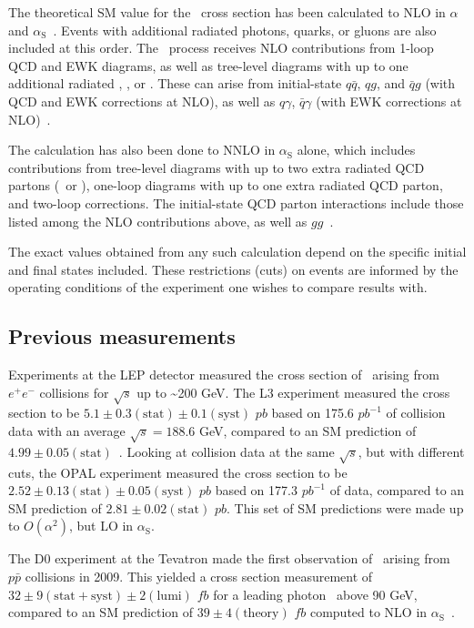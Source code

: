 \documentclass[oneside, letterpaper, 12pt, oldfontcommands]{memoir}
\begin{document}
The theoretical SM value for the \zinvg\ cross section has been calculated to NLO in $\alpha$ and $\alpha_\mathrm{S}$~\cite{ref:JHEP04(2015)018, ref:JHEP02(2016)057}.
Events with additional radiated photons, quarks, or gluons are also included at this order.
The \zinvg\ process receives NLO contributions from 1-loop QCD and EWK diagrams, as well as tree-level diagrams with up to one additional radiated \Pgamma, \Pq, or \Pg.
These can arise from initial-state $q\bar{q}$, $qg$, and $\bar{q}g$ (with QCD and EWK corrections at NLO), as well as $q\gamma$, $\bar{q}\gamma$ (with EWK corrections
at NLO)~\cite{ref:JHEP02(2016)057}.

The calculation has also been done to NNLO in $\alpha_\mathrm{S}$ alone,
which includes contributions from tree-level diagrams with up to two extra radiated QCD partons (\Pq\ or \Pg), one-loop diagrams with up to one extra
radiated QCD parton, and two-loop corrections. The initial-state QCD parton interactions include those listed among the NLO contributions above,
as well as $gg$~\cite{ref:j.physletb.2014.02.037, ref:JHEP07(2015)085}.

The exact values obtained from any such calculation depend on the specific initial and final states included. These restrictions (cuts) on events are
informed by the operating conditions of the experiment one wishes to compare results with.

\subsection{Previous measurements} \label{sec:introduction_znng_previous_measurements}
Experiments at the LEP detector measured the cross section of \zinvg\ arising from $e^{\mathrm{+}}e^{\mathrm{-}}$ collisions for $\sqrt{s}$ up to \textasciitilde200 GeV.
The L3 experiment measured the cross section to be $5.1 \pm 0.3\mathrm{(stat)} \pm 0.1\mathrm{(syst)}$ $pb$ based on 175.6 $pb^{-1}$ of collision data with an average $\sqrt{s} = 188.6$ GeV, compared to an SM
prediction of $4.99 \pm 0.05\mathrm{(stat)}$~\cite{ref:j.physletb.2004.07.002}. Looking at collision data at the same $\sqrt{s}$, but with different cuts,
the OPAL experiment measured the cross section to be $2.52 \pm 0.13\mathrm{(stat)} \pm 0.05\mathrm{(syst)}$ $pb$ based on 177.3 $pb^{-1}$ of data, compared to an SM
prediction of $2.81 \pm 0.02\mathrm{(stat)}$ $pb$. This set of SM predictions were made up to $O(\alpha^2)$, but LO in $\alpha_\mathrm{S}$.

The D0 experiment at the Tevatron made the first observation of \zinvg\ arising from $p\bar{p}$ collisions in 2009. This yielded a cross section measurement of
$32 \pm 9\mathrm{(stat+syst)} \pm 2\mathrm{(lumi)}$ $fb$ for a leading photon \pT\ above 90 GeV, compared to an SM prediction of $39 \pm 4\mathrm{(theory)}$ $fb$ computed to NLO in $\alpha_\mathrm{S}$~\cite{ref:PhysRevLett.102.201802}.
\end{document}
